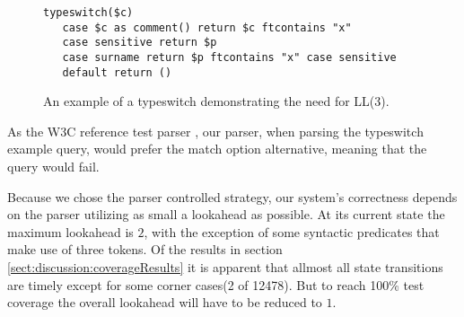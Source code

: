 \begin{figure}[h!]
\begin{Verbatim}
typeswitch($c) 
   case $c as comment() return $c ftcontains "x"
   case sensitive return $p
   case surname return $p ftcontains "x" case sensitive
   default return ()
\end{Verbatim}
\label{fig:notLL2}
\caption[A typeswitch shows the need for LL(3)]{An example of a typeswitch demonstrating the need for LL(3).}
\end{figure}

As the W3C reference test parser \cite{parserTestPage}, our parser, when parsing the typeswitch example query, would prefer the match option alternative, meaning that the query would fail.

Because we chose the parser controlled strategy, our system's correctness depends on the parser utilizing as small a lookahead as possible. At its current state the maximum lookahead is $2$, with the exception of some syntactic predicates that make use of three tokens. Of the results in section \ref{sect:discussion:coverageResults} it is apparent that allmost all state transitions are timely except for some corner cases(2 of 12478). But to reach 100\% test coverage the overall lookahead will have to be reduced to $1$. 
